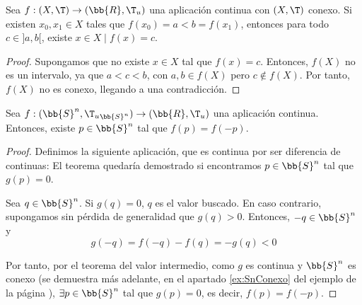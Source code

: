 \begin{teo}
    Sea $f:(X,\T)\to (\bb{R}, \T_u)$ una aplicación continua con $(X,\T)$ conexo. Si existen $x_0,x_1\in X$ tales que $f(x_0)=a<b=f(x_1)$, entonces para todo $c\in ]a,b[$, existe $x\in X\mid f(x)=c$.
\end{teo}
\begin{proof}
    Supongamos que no existe $x\in X$ tal que $f(x)=c$.
    Entonces, $f(X)$ no es un intervalo, ya que $a < c < b$, con $a,b\in f(X)$ pero $c\notin f(X)$.
    Por tanto, $f(X)$ no es conexo, llegando a una contradicción.
\end{proof}


\begin{teo}
    Sea $f:(\bb{S}^n, {\T_u}_{\bb{S}^n})\to (\bb{R}, \T_u)$ una aplicación continua. Entonces, existe $p\in \bb{S}^n$ tal que $f(p)=f(-p)$.
\end{teo}
\begin{proof}
    Definimos la siguiente aplicación, que es continua por ser diferencia de continuas:
    El teorema quedaría demostrado si encontramos $p\in \bb{S}^n$ tal que $g(p)=0$.
    
    Sea $q\in \bb{S}^n$. Si $g(q)=0$, $q$ es el valor buscado.
    En caso contrario, supongamos sin pérdida de generalidad que $g(q)>0$. Entonces,
    $-q\in \bb{S}^n$ y $$g(-q)=f(-q)-f(q)=-g(q)<0$$
    
    Por tanto, por el teorema del valor intermedio, como $g$ es continua y $\bb{S}^n$ es conexo (se demuestra más adelante, en el apartado \ref{ex:SnConexo} del ejemplo de la página \pageref{ex:SnConexo}), $\exists p\in \bb{S}^n$ tal que $g(p)=0$, es decir, $f(p)=f(-p)$.
\end{proof}

